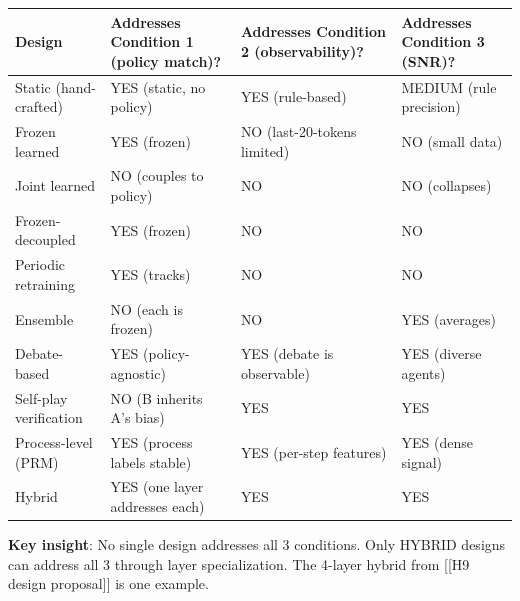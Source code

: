 \documentclass[
]{article}
\newcounter{none} %
\begin{document}
{\def\LTcaptype{none} %
\begin{longtable}[]{@{}
  >{\raggedright\arraybackslash}p{}
  >{\raggedright\arraybackslash}p{}
  >{\raggedright\arraybackslash}p{}
  >{\raggedright\arraybackslash}p{}@{}}
\toprule\noalign{}
\begin{minipage}[b]{\linewidth}\raggedright
Design
\end{minipage} & \begin{minipage}[b]{\linewidth}\raggedright
Addresses Condition 1 (policy match)?
\end{minipage} & \begin{minipage}[b]{\linewidth}\raggedright
Addresses Condition 2 (observability)?
\end{minipage} & \begin{minipage}[b]{\linewidth}\raggedright
Addresses Condition 3 (SNR)?
\end{minipage} \\
\midrule\noalign{}
\endhead
\bottomrule\noalign{}
\endlastfoot
Static (hand-crafted) & YES (static, no policy) & YES (rule-based) &
MEDIUM (rule precision) \\
Frozen learned & YES (frozen) & NO (last-20-tokens limited) & NO (small
data) \\
Joint learned & NO (couples to policy) & NO & NO (collapses) \\
Frozen-decoupled & YES (frozen) & NO & NO \\
Periodic retraining & YES (tracks) & NO & NO \\
Ensemble & NO (each is frozen) & NO & YES (averages) \\
Debate-based & YES (policy-agnostic) & YES (debate is observable) & YES
(diverse agents) \\
Self-play verification & NO (B inherits A's bias) & YES & YES \\
Process-level (PRM) & YES (process labels stable) & YES (per-step
features) & YES (dense signal) \\
Hybrid & YES (one layer addresses each) & YES & YES \\
\end{longtable}
}

\textbf{Key insight}: No single design addresses all 3 conditions. Only
HYBRID designs can address all 3 through layer specialization. The
4-layer hybrid from {[}{[}H9 design proposal{]}{]} is one example.
\end{document}
